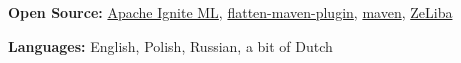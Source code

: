 \documentclass[letterpaper,11pt]{article}
\makeatletter
\newcommand{\resumeItem}[1]{
    \item\small{
            {#1 \vspace{-2pt}}
    }
}
\newcommand{\resumeProjectHeading}[2]{
    \item
    \begin{tabular*}{0.97\textwidth}{l@{\extracolsep{\fill}}r}
        \small#1 & #2 \\
    \end{tabular*}\vspace{-7pt}
}
\newcommand{\resumeSubHeadingListStart}{\begin{itemize}[leftmargin=0.15in, label={}]}
\newcommand{\resumeSubHeadingListEnd}{\end{itemize}}
\newcommand{\resumeItemListStart}{\begin{itemize}}
\newcommand{\resumeItemListEnd}{\end{itemize}\vspace{-5pt}}
\makeatother
\begin{document}
\textbf{Open Source:}
\href{https://github.com/apache/ignite/commits?author=dehasi}{Apache Ignite ML},
\href{https://github.com/mojohaus/flatten-maven-plugin/commits?author=dehasi}{flatten-maven-plugin},
\href{https://github.com/apache/maven/pull/347}{maven},
\href{https://github.com/dehasi/zeliba}{ZeLiba}

\textbf{Languages:} English, Polish, Russian, a bit of Dutch

%
%
%
%


\end{document}
